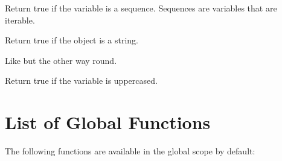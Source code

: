 \documentclass[a4paper,10pt,english]{sphinxmanual}
\begin{document}
\begin{fulllineitems}
\label{templates:sequence}
Return true if the variable is a sequence. Sequences are variables
that are iterable.

\end{fulllineitems}


\begin{fulllineitems}
Return true if the object is a string.

\end{fulllineitems}


\begin{fulllineitems}
\label{templates:undefined}
Like {\hyperref[templates:defined]{}} but the other way round.

\end{fulllineitems}


\begin{fulllineitems}
Return true if the variable is uppercased.

\end{fulllineitems}



\section{List of Global Functions}
\label{templates:builtin-globals}\label{templates:list-of-global-functions}
The following functions are available in the global scope by default:
\end{document}
